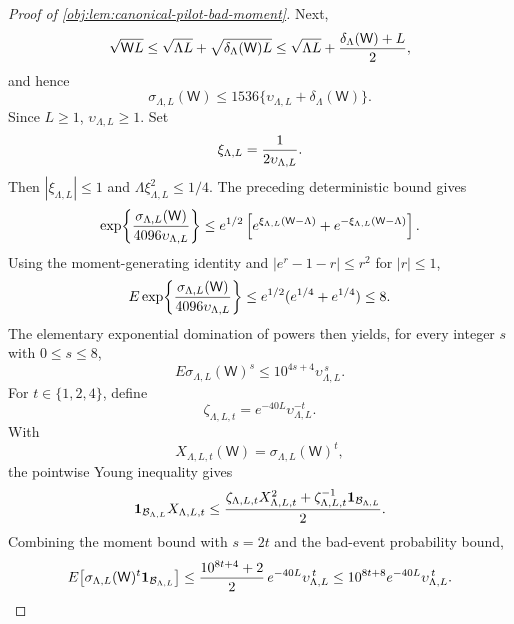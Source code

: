 \begin{proof}[Proof of \cref{obj:lem:canonical-pilot-bad-moment}]
Next,
\[
\sqrt{\mathsf W L}
\le
\sqrt{\Lambda L}+\sqrt{\delta_{\Lambda}(\mathsf W)L}
\le
\sqrt{\Lambda L}+{\delta_{\Lambda}(\mathsf W)+L\over2},
\]
and hence
\[
\sigma_{\Lambda,L}(\mathsf W)
\le
1536\{\upsilon_{\Lambda,L}+\delta_{\Lambda}(\mathsf W)\}.
\]
Since \(L\ge1\), \(\upsilon_{\Lambda,L}\ge1\).  Set
\[
\xi_{\Lambda,L}={1\over 2\upsilon_{\Lambda,L}}.
\]
Then \(|\xi_{\Lambda,L}|\le1\) and
\(\Lambda\xi_{\Lambda,L}^2\le1/4\).  The preceding deterministic bound gives
\[
\exp\!\left\{
{\sigma_{\Lambda,L}(\mathsf W)\over4096\upsilon_{\Lambda,L}}
\right\}
\le
e^{1/2}
\left[
e^{\xi_{\Lambda,L}(\mathsf W-\Lambda)}
+
e^{-\xi_{\Lambda,L}(\mathsf W-\Lambda)}
\right].
\]
Using the moment-generating identity and
\(|e^r-1-r|\le r^2\) for \(|r|\le1\),
\[
E\exp\!\left\{
{\sigma_{\Lambda,L}(\mathsf W)\over4096\upsilon_{\Lambda,L}}
\right\}
\le
e^{1/2}(e^{1/4}+e^{1/4})
\le 8.
\]
The elementary exponential domination of powers then yields, for every integer
\(s\) with \(0\le s\le8\),
\[
E\sigma_{\Lambda,L}(\mathsf W)^s
\le
10^{4s+4}\upsilon_{\Lambda,L}^{\,s}.
\]
For \(t\in\{1,2,4\}\), define
\[
\zeta_{\Lambda,L,t}
=
e^{-40L}\upsilon_{\Lambda,L}^{-t}.
\]
With
\[
X_{\Lambda,L,t}(\mathsf W)=\sigma_{\Lambda,L}(\mathsf W)^t,
\]
the pointwise Young inequality gives
\[
\mathbf 1_{\mathcal B_{\Lambda,L}}X_{\Lambda,L,t}
\le
{ \zeta_{\Lambda,L,t}X_{\Lambda,L,t}^2
+\zeta_{\Lambda,L,t}^{-1}\mathbf 1_{\mathcal B_{\Lambda,L}}
\over2}.
\]
Combining the moment bound with \(s=2t\) and the bad-event probability bound,
\[
E\!\left[
\sigma_{\Lambda,L}(\mathsf W)^t\mathbf 1_{\mathcal B_{\Lambda,L}}
\right]
\le
{10^{8t+4}+2\over2}\,
e^{-40L}\upsilon_{\Lambda,L}^{\,t}
\le
10^{8t+8}e^{-40L}\upsilon_{\Lambda,L}^{\,t}.
\]


\end{proof}
